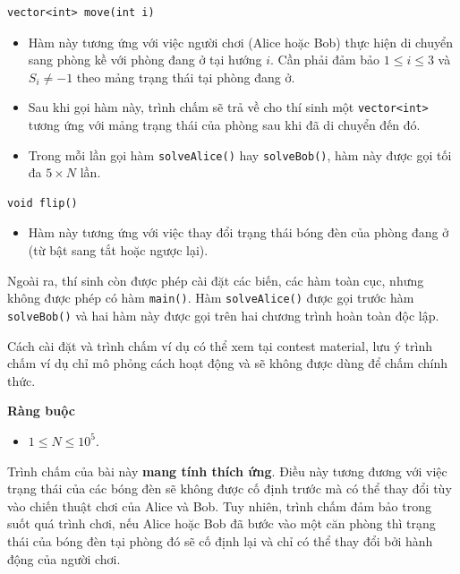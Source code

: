 \begin{lstlisting}
vector<int> move(int i)
\end{lstlisting}

\begin{itemize}
   \item Hàm này tương ứng với việc người chơi (Alice hoặc Bob) thực hiện di chuyển sang phòng kề với phòng đang ở tại hướng $i$. Cần phải đảm bảo $1\le i\le 3$ và $S_i\ne -1$ theo mảng trạng thái tại phòng đang ở.
   \item Sau khi gọi hàm này, trình chấm sẽ trả về cho thí sinh một \texttt{vector<int>} tương ứng với mảng trạng thái của phòng sau khi đã di chuyển đến đó.
   \item Trong mỗi lần gọi hàm \texttt{solveAlice()} hay \texttt{solveBob()}, hàm này được gọi tối đa $5\times N$ lần.
\end{itemize}

\begin{lstlisting}
void flip()
\end{lstlisting}

\begin{itemize}
   \item Hàm này tương ứng với việc thay đổi trạng thái bóng đèn của phòng đang ở (từ bật sang tắt hoặc ngược lại).
\end{itemize}

Ngoài ra, thí sinh còn được phép cài đặt các biến, các hàm toàn cục, nhưng không được phép có hàm \texttt{main()}. Hàm \texttt{solveAlice()} được gọi trước hàm \texttt{solveBob()} và hai hàm này được gọi trên hai chương trình hoàn toàn độc lập.

Cách cài đặt và trình chấm ví dụ có thể xem tại contest material, lưu ý trình chấm ví dụ chỉ mô phỏng cách hoạt động và sẽ không được dùng để chấm chính thức.

\textbf{Ràng buộc}

\begin{itemize}
   \item $1\le N\le 10^5$.
\end{itemize}

Trình chấm của bài này \textbf{mang tính thích ứng}. Điều này tương đương với việc trạng thái của các bóng đèn sẽ không được cố định trước mà có thể thay đổi tùy vào chiến thuật chơi của Alice và Bob. Tuy nhiên, trình chấm đảm bảo trong suốt quá trình chơi, nếu Alice hoặc Bob đã bước vào một căn phòng thì trạng thái của bóng đèn tại phòng đó sẽ cố định lại và chỉ có thể thay đổi bởi hành động của người chơi.